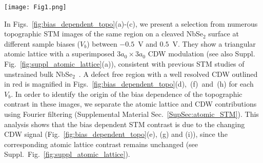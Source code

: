 \documentclass[aps,prl,twocolumn,superscriptaddress]{revtex4-2}
\def \suppsec[#1]{Supplemental Material Sec.~\ref{#1}}
\def \SF[#1]{Suppl.~Fig.~\ref{#1}}
\begin{document}
\begin{figure*}[htp!]
\texttt{[image: Fig1.png]}%
\caption{\label{fig:bias_dependent_topo} \textbf{Bias dependent STM imaging of NbSe$_2$ at 1.2~K.} Constant current topography showing the atomic lattice and CDW at (a) $V_{b}=50$~mV, (b) $V_{b}=-50$~mV and (c) $V_{b}=-150$~mV \cite{comment1} with $I_t=100$~pA. (d), (f) and (h) are magnified images of the areas marked by the red squares in (a),(b) and (c), respectively. The overall imaging contrast is very different in these cases, although the atomic lattice appears identical in all images (\SF[fig:suppl_atomic_lattice]). Panel (e),(g) and (i) show the magnified image of the large Fourier-filtered image of the CDWs at the same location as shown in (d),(f) and (h) respectively. It demonstrates that the variation of contrast observed in (e),(g) and (i) is stemming from a variation in the appearance of the CDW at different biases. These appearances can be quantified by a single parameter: the dephasing parameter which describes the relative position of the three CDWs.
(j)-(l) show the spatial variation of the dephasing parameter determined by fitting the CDW modulations of the STM images shown in (a)-(c), respectively. The red squares corresponds to the same area which are highlighted in (a)-(c) and magnified in (d)-(i).
Scalebar: 10 nm in (a)-(c) and (j)-(l); 1 nm in (d)-(i).}
\end{figure*}

In Figs.~\ref{fig:bias_dependent_topo}(a)-(c), we present a selection from numerous topographic STM images of the same region on a cleaved NbSe$_2$ surface at different sample biases ($V_b$) between $-0.5$~V and $0.5$~V. They show a triangular atomic lattice with a superimposed $3a_0\times3a_0$ CDW modulation (see also Suppl. Fig.~\ref{fig:suppl_atomic_lattice}(a)), consistent with previous STM studies of unstrained bulk NbSe$_2$~\cite{Mallet1996,Soumyanarayanan2013,Arguello2014,Gao2018,Castro2018nanolett,Gye2019, Guster2019,Pasztor2019}. A defect free region with a well resolved CDW outlined in red is magnified in Figs.~\ref{fig:bias_dependent_topo}(d),~(f)~and~(h) for each $V_b$. In order to identify the origin of the bias dependence of the topographic contrast in these images, we separate the atomic lattice and CDW contributions using Fourier filtering (\suppsec[SupSec:atomic_STM]). This analysis shows that the bias dependent STM contrast is due to the changing CDW signal (Fig.~\ref{fig:bias_dependent_topo}(e), (g) and (i)), since the corresponding atomic lattice contrast remains unchanged (see \SF[fig:suppl_atomic_lattice]).
\end{document}
